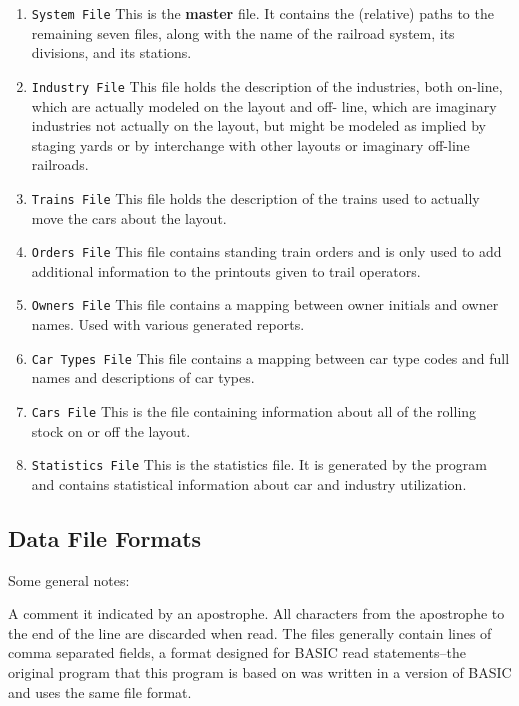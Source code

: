 \begin{enumerate}
\item \verb=System File= This is the \textbf{master} file.  It contains the
(relative) paths to the remaining seven files, along with the name of
the railroad system, its divisions, and its stations.

\item \verb=Industry File= This file holds the description of the
industries, both on-line, which are actually modeled on the layout and
off- line, which are imaginary industries not actually on the layout,
but might be modeled as implied by staging yards or by interchange with
other layouts or imaginary off-line railroads.

\item \verb=Trains File= This file holds the description of the trains used
to actually move the cars about the layout.

\item \verb=Orders File= This file contains standing train orders and is
only used to add additional information to the printouts given to trail
operators.

\item \verb=Owners File= This file contains a mapping between owner initials
and owner names.  Used with various generated reports.

\item \verb=Car Types File= This file contains a mapping between car type
codes and full names and descriptions of car types.

\item \verb=Cars File= This is the file containing information about all of
the rolling stock on or off the layout.

\item \verb=Statistics File= This is the statistics file.  It is generated
by the program and contains statistical information about car and
industry utilization.
\end{enumerate}


\subsection{Data File Formats}
\label{sect:fcf:File Formats}

Some general notes:

A comment it indicated by an apostrophe.  All characters from the
apostrophe to the end of the line are discarded when read.  The files
generally contain lines of comma separated fields, a format
designed for BASIC read statements--the original program that this
program is based on was written in a version of BASIC and uses the same
file format.

